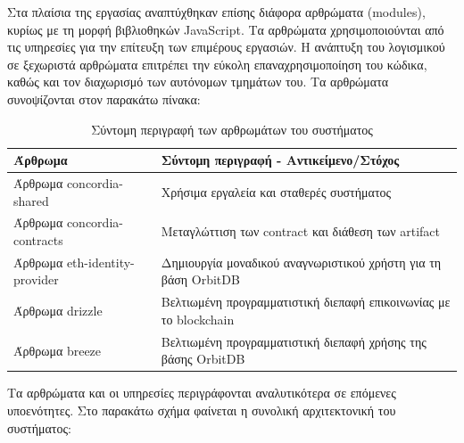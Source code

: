 Στα πλαίσια της εργασίας αναπτύχθηκαν επίσης διάφορα αρθρώματα (modules), κυρίως με τη μορφή βιβλιοθηκών JavaScript. Τα αρθρώματα χρησιμοποιούνται από τις υπηρεσίες για την επίτευξη των επιμέρους εργασιών. Η ανάπτυξη του λογισμικού σε ξεχωριστά αρθρώματα επιτρέπει την εύκολη επαναχρησιμοποίηση του κώδικα, καθώς και τον διαχωρισμό των αυτόνομων τμημάτων του. Τα αρθρώματα συνοψίζονται στον παρακάτω πίνακα:

\begin{table}[H]
    \begin{center}
        \begin{tabularx}{\textwidth}{l X}
            \toprule
            \textbf{Άρθρωμα} & \textbf{Σύντομη περιγραφή - Αντικείμενο/Στόχος} \\
            \midrule
            Άρθρωμα concordia-shared      & Χρήσιμα εργαλεία και σταθερές συστήματος \\ [0.5ex]
            Άρθρωμα concordia-contracts   & Μεταγλώττιση των contract και διάθεση των artifact \\ [0.5ex]
            Άρθρωμα eth-identity-provider & Δημιουργία μοναδικού αναγνωριστικού χρήστη για τη βάση OrbitDB \\ [0.5ex]
            Άρθρωμα drizzle               & Βελτιωμένη προγραμματιστική διεπαφή επικοινωνίας με το blockchain \\ [0.5ex]
            Άρθρωμα breeze                & Βελτιωμένη προγραμματιστική διεπαφή χρήσης της βάσης OrbitDB \\ [0.5ex]
            \bottomrule
        \end{tabularx}
    \end{center}
    \caption{Σύντομη περιγραφή των αρθρωμάτων του συστήματος}
    \label{table:4-3-software-modules-summary}
\end{table}

\newpage
Τα αρθρώματα και οι υπηρεσίες περιγράφονται αναλυτικότερα σε επόμενες υποενότητες. Στο παρακάτω σχήμα φαίνεται η συνολική αρχιτεκτονική του συστήματος:

\vspace{\baselineskip}


